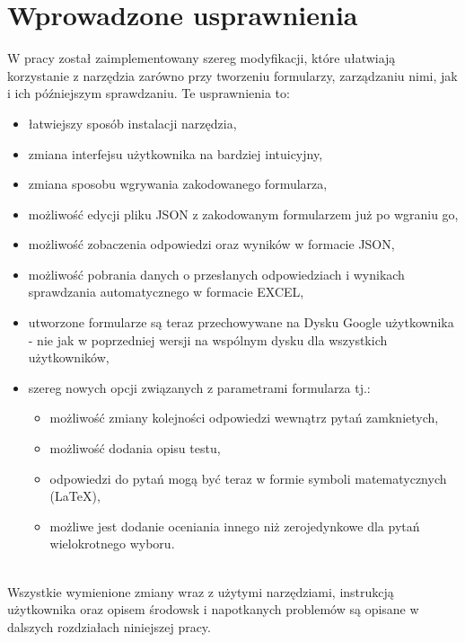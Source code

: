  \section{Wprowadzone usprawnienia}
W pracy został zaimplementowany szereg modyfikacji, które ułatwiają korzystanie z narzędzia
zarówno przy tworzeniu formularzy, zarządzaniu nimi, jak i ich późniejszym sprawdzaniu. Te usprawnienia to:
\begin{itemize}
  \item łatwiejszy sposób instalacji narzędzia,
  \item zmiana interfejsu użytkownika na bardziej intuicyjny,
  \item zmiana sposobu wgrywania zakodowanego formularza,
  \item możliwość edycji pliku JSON z zakodowanym formularzem już po wgraniu go,
  \item możliwość zobaczenia odpowiedzi oraz wyników w formacie JSON,
  \item możliwość pobrania danych o przesłanych odpowiedziach 
   i wynikach sprawdzania automatycznego w formacie EXCEL,
  \item utworzone formularze są teraz przechowywane na Dysku Google użytkownika 
  - nie jak w poprzedniej wersji na wspólnym dysku dla wszystkich użytkowników,
  \item szereg nowych opcji związanych z parametrami formularza tj.:
  \begin{itemize}
    \item możliwość zmiany kolejności odpowiedzi wewnątrz pytań zamknietych,
    \item możliwość dodania  opisu testu,
    \item odpowiedzi do pytań mogą być teraz w formie symboli  matematycznych (\LaTeX),
    \item możliwe jest dodanie oceniania innego niż zerojedynkowe dla pytań
     wielokrotnego wyboru.
  \end{itemize}  
\end{itemize}

\\Wszystkie wymienione zmiany wraz z użytymi narzędziami, instrukcją użytkownika oraz opisem
środowsk i napotkanych problemów są opisane w dalszych rozdziałach niniejszej pracy. 

